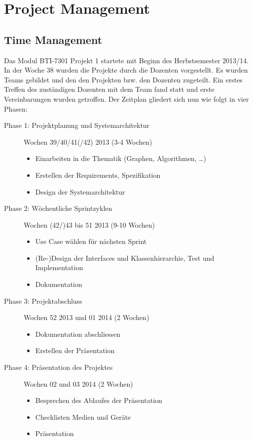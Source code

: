 \chapter{Project Management}
% 
\section{Time Management}
\label{sec:Time Management}
Das Modul BTI-7301 Projekt 1 startete mit Beginn des Herbstsemester 2013/14. In der Woche 38 wurden die Projekte durch die Dozenten vorgestellt. Es wurden Teams gebildet und den den Projekten bzw. den Dozenten zugeteilt. Ein erstes Treffen des zust\"andigen Dozenten mit dem Team fand statt und erste Vereinbarungen wurden getroffen. Der Zeitplan gliedert sich nun wie folgt in vier Phasen:
\begin{description}
  \item[Phase 1: Projektplanung und Systemarchitektur] Wochen 39/40/41(/42) 2013 (3-4 Wochen)
  \begin{itemize}
    \item Einarbeiten in die Thematik (Graphen, Algorithmen, \dots)
    \item Erstellen der Requirements, Spezifikation
    \item Design der Systemarchitektur
  \end{itemize}
  \item[Phase 2: W\"ochentliche Sprintzyklen] Wochen (42/)43 bis 51 2013 (9-10 Wochen)
  \begin{itemize}
    \item Use Case w\"ahlen f\"ur n\"achsten Sprint
    \item (Re-)Design der Interfaces und Klassenhierarchie, Test und Implementation
    \item Dokumentation
  \end{itemize}
  \item[Phase 3: Projektabschluss] Wochen 52 2013 und 01 2014 (2 Wochen)
  \begin{itemize}
    \item Dokumentation abschliessen
    \item Erstellen der Pr\"asentation
  \end{itemize}
  \item[Phase 4: Pr\"asentation des Projektes] Wochen 02 und 03 2014 (2 Wochen)
  \begin{itemize}
    \item Besprechen des Ablaufes der Pr\"asentation
    \item Checklisten Medien und Ger\"ate
    \item Pr\"asentation
  \end{itemize}
\end{description}
% 
